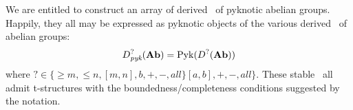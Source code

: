 \begin{cnstr}
	We are entitled to construct an array of derived \categories\ of pyknotic abelian groups.
	Happily, they all may be expressed as pyknotic objects of the various derived \categories\ of abelian groups:
	\[
		D_{\textit{pyk}}^?(\textbf{\textup{Ab}}) = \operatorname{Pyk}(D^?(\textbf{\textup{Ab}})) 
	\]
	where $ ? \in \{ {\geq m}, {\leq n}, {[m, n]}, {b}, {+}, {-}, {\textit{all}} \} {[a, b]}, {+}, {-}, {\textit{all}} \} $.
	These stable \categories\ all admit t-structures with the boundedness/completeness conditions suggested by the notation. 
\end{cnstr}











